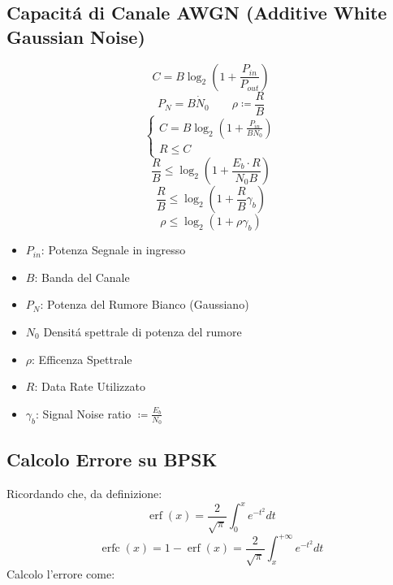 \documentclass{article}
\DeclareMathOperator\erf{erf}
\DeclareMathOperator\erfc{erfc}
\begin{document}
\subsection{Capacit\'a di Canale AWGN (Additive White Gaussian Noise)}
\begin{minipage}{0.4\textwidth}
\[
    C = B\log_2(1 + \frac{P_{in}}{P_{out}})
\]
\[ P_N = B \dot N_0 \qquad \rho \coloneqq \frac{R}{B} \]
\[
    \begin{cases}
        C = B\log_2\left( 1 + \frac{P_{in}}{BN_0}\right)\\
        R \le C
    \end{cases}
\]
\[  \frac{R}{B} \le \log_2\left(1 + \frac{E_b \cdot R}{N_0B}\right) \]
\[  \frac{R}{B} \le \log_2\left(1 + \frac{R}{B}\gamma_b\right) \]
\[ \rho \le \log_2 \left( 1 + \rho \gamma_b\right) \]

\end{minipage}
\begin{minipage}{0.6\textwidth}
    \begin{itemize}
        \item $P_{in}$: Potenza Segnale in ingresso
        \item $B$: Banda del Canale
        \item $P_N$: Potenza del Rumore Bianco (Gaussiano)
        \item $N_0$ Densit\'a spettrale di potenza del rumore
        \item $\rho$: Efficenza Spettrale
        \item $R$: Data Rate Utilizzato
        \item $\gamma_b$: Signal Noise ratio $\coloneqq \frac{E_b}{N_0}$
    \end{itemize}
\end{minipage}

\subsection{Calcolo Errore su BPSK}
Ricordando che, da definizione:
\[ \erf(x) = \frac{2}{\sqrt{\pi}}\int_0^x e^{-t^2} dt\]
\[ \erfc(x) = 1-\erf(x) = \frac{2}{\sqrt{\pi}}\int_x^{+\infty} e^{-t^2}dt\]
Calcolo l'errore come:
\end{document}
